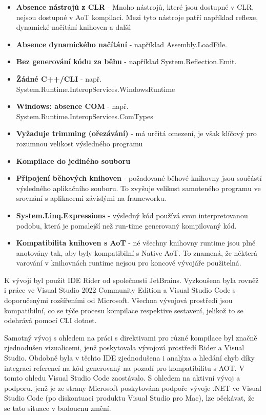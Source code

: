 \begin{itemize}
    \item  \textbf{Absence nástrojů z CLR} - Mnoho nástrojů, které jsou dostupné v CLR, nejsou dostupné v AoT kompilaci. Mezi tyto nástroje patří například reflexe, dynamické načítání knihoven a další.
    \item \textbf{Absence dynamického načítání} - například Assembly.LoadFile.
    \item \textbf{Bez generování kódu za běhu} - například System.Reflection.Emit.
    \item \textbf{Žádné C++/CLI} - např. System.Runtime.InteropServices.WindowsRuntime
    \item \textbf{Windows: absence COM} - např. System.Runtime.InteropServices.ComTypes
    \item \textbf{Vyžaduje trimming (ořezávání)} - má určitá omezení, je však klíčový pro rozumnou velikost výsledného programu
    \item \textbf{Kompilace do jediného souboru} 
    \item \textbf{Připojení běhových knihoven} - požadované běhové knihovny jsou součástí výsledného aplikačního souboru. To zvyšuje velikost samoteného programu ve srovnání s aplikacemi závislými na frameworku.
    \item \textbf{System.Linq.Expressions} - výsledný kód používá svou interpretovanou podobu, která je pomalejší než run-time generovaný kompilovaný kód.
    \item \textbf{Kompatibilita knihoven s AoT} - né všechny knihovny runtime jsou plně anotovány tak, aby byly kompatibilní s Native AoT. To znamená, že některá varování v knihovnách runtime nejsou pro koncové vývojáře použitelná.
\end{itemize}



K vývoji byl použit IDE Rider od společnosti JetBrains. Vyzkoušena byla rovněž i práce ve Visual Studio 2022 Community Edition a Visual Studio Code s doporučenými rozšířeními od Microsoft. Všechna vývojová prostředí jsou kompatibilní, co se týče procesu kompilace respektive sestavení, jelikož to se odehrává pomocí CLI dotnet.

Samotný vývoj s ohledem na práci s direktivami pro různé kompilace byl značně zjednodušen vizualicemi, jenž poskytovala vývojová prostředí Rider a Visual Studio. Obdobně byla v těchto IDE zjednodušena i analýza a hledání chyb díky integraci referencí na kód generovaný na pozadí pro kompatibilitu s AOT. V tomto ohledu Visual Studio Code zaostávalo. S ohledem na aktivní vývoj a podporu, jenž je ze strany Microsoft poskytována podpoře vývoje .NET ve Visual Studio Code (po diskontuaci produktu Visual Studio pro Mac), lze očekávat, že se tato situace v budoucnu změní.

